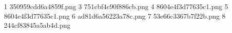 1 350959cdd6a4859f.png
3 751cbf4c90f886cb.png
4 8604e4f3d77635c1.png
5 8604e4f3d77635c1.png
6 ad81d6a56223a78c.png
7 53e66c3367b7f22b.png
8 244cf83845a5ab4d.png
